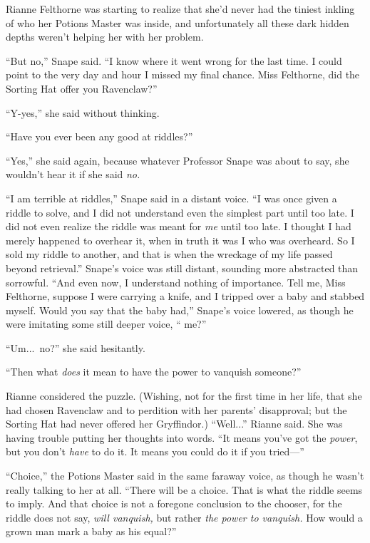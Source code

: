 Rianne Felthorne was starting to realize that she’d never had the tiniest inkling of who her Potions Master was inside, and unfortunately all these dark hidden depths weren’t helping her with her problem.

“But no,” Snape said. “I know where it went wrong for the last time. I could point to the very day and hour I missed my final chance. Miss Felthorne, did the Sorting Hat offer you Ravenclaw?”

“Y-yes,” she said without thinking.

“Have you ever been any good at riddles?”

“Yes,” she said again, because whatever Professor Snape was about to say, she wouldn’t hear it if she said \emph{no.}

“I am terrible at riddles,” Snape said in a distant voice. “I was once given a riddle to solve, and I did not understand even the simplest part until too late. I did not even realize the riddle was meant for \emph{me} until too late. I thought I had merely happened to overhear it, when in truth it was I who was overheard. So I sold my riddle to another, and that is when the wreckage of my life passed beyond retrieval.” Snape’s voice was still distant, sounding more abstracted than sorrowful. “And even now, I understand nothing of importance. Tell me, Miss Felthorne, suppose I were carrying a knife, and I tripped over a baby and stabbed myself. Would you say that the baby had,” Snape’s voice lowered, as though he were imitating some still deeper voice, “ me?”

“Um...\ no?” she said hesitantly.

“Then what \emph{does} it mean to have the power to vanquish someone?”

Rianne considered the puzzle. (Wishing, not for the first time in her life, that she had chosen Ravenclaw and to perdition with her parents’ disapproval; but the Sorting Hat had never offered her Gryffindor.) “Well...” Rianne said. She was having trouble putting her thoughts into words. “It means you’ve got the \emph{power}, but you don’t \emph{have} to do it. It means you could do it if you tried—”

“Choice,” the Potions Master said in the same faraway voice, as though he wasn’t really talking to her at all. “There will be a choice. That is what the riddle seems to imply. And that choice is not a foregone conclusion to the chooser, for the riddle does not say, \emph{will vanquish,} but rather \emph{the power to vanquish.} How would a grown man mark a baby as his equal?”

